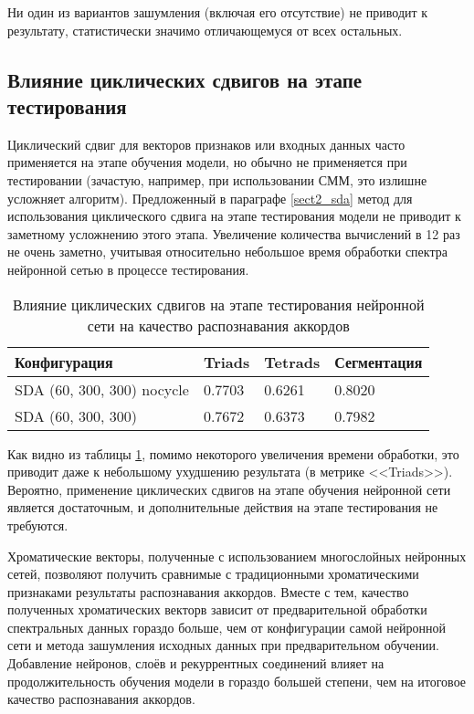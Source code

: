 Ни один из вариантов зашумления (включая его отсутствие) не приводит к
результату, статистически значимо отличающемуся от всех остальных.

\subsection{Влияние циклических сдвигов на этапе тестирования}
\label{ssect3_cycletest}

Циклический сдвиг для векторов признаков или входных данных часто применяется на
этапе обучения модели, но обычно не применяется при тестировании (зачастую,
например, при использовании СММ, это излишне усложняет алгоритм). Предложенный в
параграфе \ref{sect2_sda} метод для использования циклического сдвига на этапе
тестирования модели не приводит к заметному усложнению этого этапа. Увеличение
количества вычислений в 12 раз не очень заметно, учитывая относительно небольшое
время обработки спектра нейронной сетью в процессе тестирования.

\begin{table} [htbp]
  \centering
  \parbox{15cm}{\caption{Влияние циклических сдвигов на этапе тестирования
  нейронной сети на качество распознавания аккордов}
  \label{Tnncyctest}}
  \begin{tabular}{|l|l|l|l|}
  \hline
  Конфигурация & Triads & Tetrads & Сегментация \\
  \hline
  SDA (60, 300, 300) nocycle & 0.7703 & 0.6261 & 0.8020 \\
  SDA (60, 300, 300) & 0.7672 & 0.6373 & 0.7982 \\
  \hline
  \end{tabular}
\end{table}

Как видно из таблицы \ref{Tnncyctest}, помимо некоторого увеличения времени
обработки, это приводит даже к небольшому ухудшению результата (в метрике
<<Triads>>). Вероятно, применение циклических сдвигов на этапе обучения
нейронной сети является достаточным, и дополнительные действия на этапе
тестирования не требуются.

\medskip

Хроматические векторы, полученные с использованием многослойных нейронных сетей,
позволяют получить сравнимые с традиционными хроматическими признаками
результаты распознавания аккордов. Вместе с тем, качество полученных
хроматических векторв зависит от предварительной обработки спектральных данных
гораздо больше, чем от конфигурации самой нейронной сети и метода зашумления
исходных данных при предварительном обучении. Добавление нейронов, слоёв и
рекуррентных соединений влияет на продолжительность обучения модели в гораздо
большей степени, чем на итоговое качество распознавания аккордов.

